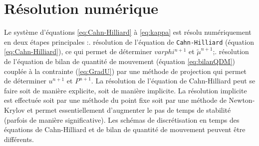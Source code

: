 \section{R\'esolution num\'erique}
Le syst\`eme d'\'equations \ref{eq:Cahn-Hilliard} \`a \ref{eq:kappa} est r\'esolu num\'eriquement en deux \'etapes principales :\smallskip{}. r\'esolution de l'\'equation de \texttt{Cahn-Hilliard} (\'equation \ref{eq:Cahn-Hilliard}), ce qui permet de d\'eterminer $varphi^{n+1}$ et $\tilde{\mu}^{n+1}$;\smallskip{}. r\'esolution de l'\'equation de bilan de quantit\'e de mouvement (\'equation \ref{eq:bilanQDM}) coupl\'ee \`a la contrainte (\ref{eq:GradU}) par une m\'ethode de
projection qui permet de d\'eterminer $u^{n+1}$ et $P^{n+1}$.\medskip\newline
La r\'esolution de l'\'equation de Cahn-Hilliard peut se faire soit de mani\`ere explicite, soit de mani\`ere implicite. La r\'esolution implicite est effectu\'ee
soit par une m\'ethode du point fixe soit par une m\'ethode de Newton-Krylov et permet essentiellement d'augmenter le pas de temps de stabilit\'e (parfois de
mani\`ere significative).\newline
Les sch\'emas de discr\'etisation en temps des \'equations de Cahn-Hilliard et de bilan de quantit\'e de mouvement peuvent \^etre diff\'erents.


